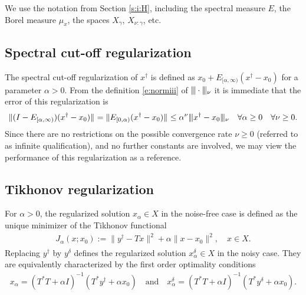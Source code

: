 \documentclass[10pt, a4paper]{iopart}
\newcommand{\norm}[2]{     \| #1       \|_{ #2 }}
\newcommand{\normiii}[2]{\vert\kern-0.25ex\vert\kern-0.25ex\vert #1 \vert\kern-0.25ex \vert\kern-0.25ex\vert_{ #2 }}
\theoremstyle{remark}
\theoremstyle{definition}
\newcommand{\TODO}[1]{\textrm{\color{red}TODO: #1}}
\begin{document}
%
We use the notation
from Section \ref{s:i:H},
including
the spectral measure $E$, 
the Borel measure $\mu_x$, 
the spaces $X_\gamma$, $X_{\nu:\gamma}$, etc.
%


\subsection{Spectral cut-off regularization}
\label{s:ip:cut}

The spectral cut-off regularization of $x^\dag$ is defined
as $x_0 + E_{[\alpha, \infty)} (x^\dag - x_0)$
for a parameter $\alpha > 0$.
%
From the definition \eqref{e:normiii} of $\normiii{\cdot}{\nu}$
it is immediate that
the error of this regularization is 
\begin{align}
\label{e:coerr}
	\norm{(I - E_{[\alpha, \infty)}) (x^\dag - x_0)}{}
	=
	\norm{E_{[0, \alpha)} (x^\dag - x_0)}{} 
	\leq 
	\alpha^\nu \normiii{x^\dag - x_0}{\nu}
	\quad
	\forall \alpha \geq 0
	\quad
	\forall \nu \geq 0
	.
\end{align}
%
Since there are no restrictions on the possible convergence rate $\nu \geq 0$
(referred to as infinite qualification),
and no further constants are involved,
we may view the performance of this regularization as a reference.

\subsection{Tikhonov regularization}
\label{s:ip:T}

For $\alpha > 0$, 
the regularized solution $x_\alpha \in X$ in the noise-free case
is defined 
as the unique minimizer of the Tikhonov functional
\begin{align}
\label{e:J}
	J_\alpha(x; x_0)
	:=
	\norm{ y^\dag - T x }{}^2
	+
	\alpha
	\norm{ x - x_0 }{}^2,
	\quad
	x \in X
	.
\end{align}
%
Replacing $y^\dag$ by $y^\delta$
defines
the regularized solution $x_\alpha^\delta \in X$ 
in the noisy case.
%
They are equivalently characterized by
the first order optimality conditions
\begin{align}
\label{e:xx}
	x_\alpha = (T^* T + \alpha I)^{-1} (T^* y^\dag + \alpha x_0)
	\quad\text{and}\quad
	x_\alpha^\delta = (T^* T + \alpha I)^{-1} (T^* y^\delta + \alpha x_0)
	.
\end{align}
\end{document}
